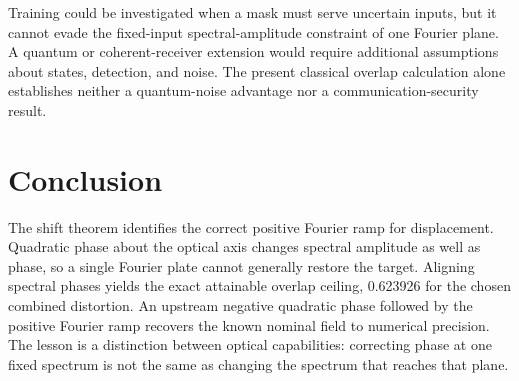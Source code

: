 \documentclass[10pt,a4paper]{article}
\begin{document}
Training could be investigated when a mask must serve uncertain inputs, but it cannot evade the fixed-input spectral-amplitude constraint of one Fourier plane. A quantum or coherent-receiver extension would require additional assumptions about states, detection, and noise. The present classical overlap calculation alone establishes neither a quantum-noise advantage nor a communication-security result.

\section{Conclusion}
The shift theorem identifies the correct positive Fourier ramp for displacement. Quadratic phase about the optical axis changes spectral amplitude as well as phase, so a single Fourier plate cannot generally restore the target. Aligning spectral phases yields the exact attainable overlap ceiling, 0.623926 for the chosen combined distortion. An upstream negative quadratic phase followed by the positive Fourier ramp recovers the known nominal field to numerical precision. The lesson is a distinction between optical capabilities: correcting phase at one fixed spectrum is not the same as changing the spectrum that reaches that plane.
\end{document}
